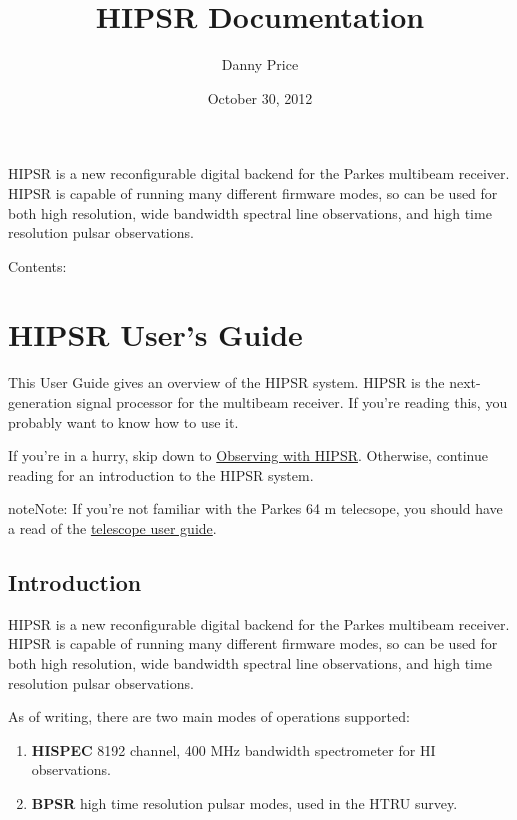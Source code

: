 \documentclass[letterpaper,10pt,english]{sphinxmanual}
\title{HIPSR Documentation}
\date{October 30, 2012}
\author{Danny Price}
\begin{document}
\maketitle
\tableofcontents
{}\label{index::doc}


HIPSR is a new reconfigurable digital backend for the Parkes multibeam receiver. HIPSR is capable of running many different firmware modes, so can be used for both high resolution, wide bandwidth spectral line observations, and high time resolution pulsar observations.

Contents:


\chapter{HIPSR User's Guide}
\label{user_guide:hipsr-hi-pulsar-signal-processor}\label{user_guide:hipsr-user-s-guide}\label{user_guide::doc}
This User Guide gives an overview of the HIPSR system. HIPSR is the next-generation
signal processor for the multibeam receiver. If you're reading this, you probably want
to know how to use it.

If you're in a hurry, skip down to {\hyperref[user_guide:observing-with-hipsr]{Observing with HIPSR}}. Otherwise, continue reading
for an introduction to the HIPSR system.

\begin{notice}{note}{Note:}
If you're not familiar with the Parkes 64 m telecsope, you should have a read of
the \href{http://www.parkes.atnf.csiro.au/observing/documentation/user\_guide/}{telescope user guide}.
\end{notice}


\section{Introduction}
\label{user_guide:introduction}
HIPSR is a new reconfigurable digital backend for the Parkes multibeam receiver. HIPSR is capable of running many different firmware modes, so can be used for both high resolution, wide bandwidth spectral line observations, and high time resolution pulsar observations.

As of writing, there are two main modes of operations supported:
\begin{enumerate}
\item {} 
\textbf{HISPEC} 8192 channel, 400 MHz bandwidth spectrometer for HI observations.

\item {} 
\textbf{BPSR}   high time resolution pulsar modes, used in the HTRU survey.

\end{enumerate}
\end{document}
